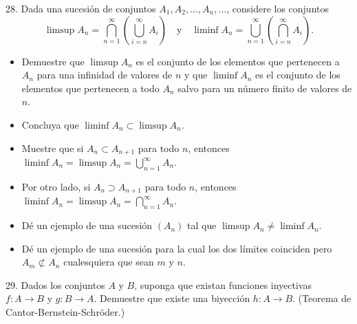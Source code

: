 28. Dada una sucesión de conjuntos \( A_1, A_2, \dots, A_n, \dots \), considere los conjuntos  
\[
\limsup A_n = \bigcap_{n=1}^{\infty} \left( \bigcup_{i=n}^{\infty} A_i \right) \quad \text{y} \quad \liminf A_n = \bigcup_{n=1}^{\infty} \left( \bigcap_{i=n}^{\infty} A_i \right).
\]
\begin{itemize}
    \item[a)] Demuestre que \(\limsup A_n\) es el conjunto de los elementos que pertenecen a \(A_n\) para una infinidad de valores de \(n\) y que \(\liminf A_n\) es el conjunto de los elementos que pertenecen a todo \(A_n\) salvo para un número finito de valores de \(n\).
    \item[b)] Concluya que \(\liminf A_n \subset \limsup A_n\).
    \item[c)] Muestre que si \(A_n \subset A_{n+1}\) para todo \(n\), entonces \(\liminf A_n = \limsup A_n = \bigcup_{n=1}^{\infty} A_n\).
    \item[d)] Por otro lado, si \(A_n \supset A_{n+1}\) para todo \(n\), entonces \(\liminf A_n = \limsup A_n = \bigcap_{n=1}^{\infty} A_n\).
    \item[e)] Dé un ejemplo de una sucesión \((A_n)\) tal que \(\limsup A_n \neq \liminf A_n\).
    \item[f)] Dé un ejemplo de una sucesión para la cual los dos límites coinciden pero \(A_m \not\subset A_n\) cualesquiera que sean \(m\) y \(n\).
\end{itemize}

29. Dados los conjuntos \(A\) y \(B\), suponga que existan funciones inyectivas \(f: A \to B\) y \(g: B \to A\). Demuestre que existe una biyección \(h: A \to B\). (Teorema de Cantor-Bernstein-Schröder.)
